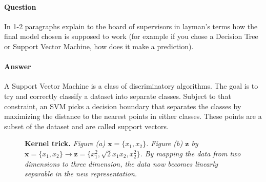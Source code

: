 \documentclass[12pt]{article}
\renewcommand{\vec}[1]{\mathbf{#1}}
\begin{document}
\paragraph{\textbf{Question}} In 1-2 paragraphs explain to the board of supervisors in layman's terms how the final model chosen is supposed to work (for example if you chose a Decision Tree or Support Vector Machine, how does it make a prediction).

\paragraph{\textbf{Answer}} A Support Vector Machine is a class of discriminatory algorithms. The goal is to try and correctly classify a dataset into separate classes. Subject to that constraint, an SVM  picks a decision boundary that separates the classes by maximizing the distance to the nearest points in either classes. These points are a subset of the dataset and are called support vectors. 


\begin{figure}[!hbtp]
\centering
    \caption{\textbf{Kernel trick.} \textit{Figure (a) $\vec{x} = \{x_1,x_2\}$. Figure (b) $\vec{z}$ by $\vec{x} = \{x_1,x_2\} \longrightarrow \vec{z} = \{x_1^2, \sqrt2x_1x_2, x_2^2 \}$. By mapping the data from two dimensions to three dimension, the data now becomes linearly separable in the new representation.}}
\end{figure}
\end{document}
